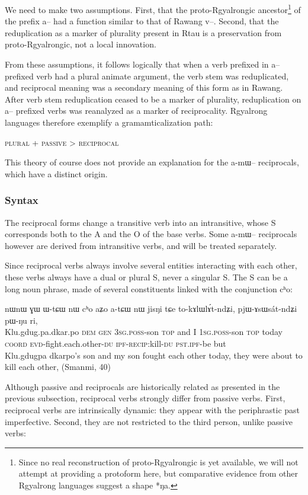 \documentclass[oldfontcommands,oneside,a4paper,11pt]{memoir}
\newcommand{\ipa}[1]{{\phon #1}} %
\newcommand{\coord}{\textsc{coord}}
\newcommand{\dem}{\textsc{dem}}
\newcommand{\du}{\textsc{du}}
\newcommand{\evd}{\textsc{evd}}
\newcommand{\gen}{\textsc{gen}}
\newcommand{\ipf}{\textsc{ipf}}
\newcommand{\poss}{\textsc{poss}}
\newcommand{\pst}{\textsc{pst}}
\newcommand{\sg}{\textsc{sg}}
\newcommand{\topic}{\textsc{top}}
\begin{document}
We need to make two assumptions. First, that the proto-Rgyalrongic  ancestor\footnote{Since no real reconstruction of proto-Rgyalrongic is yet available, we will not attempt at providing a protoform here, but comparative evidence from other Rgyalrong languages suggest a shape *ŋa.} of the prefix \ipa{a}-- had a function similar to that of Rawang \ipa{v}--. Second, that the reduplication as a marker of plurality present in Rtau is a preservation from proto-Rgyalrongic, not a local innovation.

From these assumptions, it follows logically that when a verb prefixed in  \ipa{a}--  prefixed verb had a plural animate argument, the verb stem was reduplicated, and   reciprocal meaning was a secondary meaning of this form as in Rawang. After verb stem reduplication ceased to be a marker of plurality, reduplication on \ipa{a}--  prefixed verbs was reanalyzed as a marker of reciprocality. Rgyalrong languages therefore exemplify a gramamticalization path:

\begin{exe}
\ex
 \glt  \textsc{plural} + \textsc{passive} > \textsc{reciprocal}
\end{exe} 

This theory of course does not provide an explanation for the  \ipa{a-mɯ}-- reciprocals, which have a distinct origin.


\subsubsection{Syntax}
The reciprocal forms change a transitive verb into an intransitive, whose S corresponds both to the A and the O of the base verbs. Some  \ipa{a-mɯ}-- reciprocals however are derived from intransitive verbs, and will be treated separately.

Since reciprocal verbs always involve several entities interacting with each other, these verbs always have a dual or plural S, never a singular S. The S can be a long noun phrase, made of several constituents linked with the conjunction \ipa{cʰo}:


\begin{exe}
\ex
\gll 	 	\ipa{qʰlɯʁdɯɣpakɤrpu} 	\ipa{nɯnɯ} 	\ipa{ɣɯ} 	\ipa{ɯ-tɕɯ} 	\ipa{nɯ} 	\ipa{cʰo} 	\ipa{aʑo} 	\ipa{a-tɕɯ} 	\ipa{nɯ} 	\ipa{jisŋi} 	\ipa{tɕe} 	\ipa{to-kɤlɯlɤ́t-ndʑi,} 	\ipa{pjɯ-ɤsɯsát-ndʑi} 	\ipa{pɯ-ŋu} 	\ipa{ri,} \\
Klu.gdug.pa.dkar.po \dem{} \gen{} 3\sg{}.\poss{}-son \topic{} and I 1\sg{}.\poss{}-son \topic{} today \coord{} \evd{}-fight.each.other-\du{} \ipf{}-\textsc{recip}:kill-\du{} \pst{}.\ipf{}-be but \\
 \glt  Klu.gdugpa dkarpo's son and my son  fought each other today, they were about to kill each other,  (Smanmi, 40)
 
\end{exe} 
Although passive and reciprocals are historically related as presented in the previous subsection, reciprocal verbs strongly differ from passive verbs. First, reciprocal verbs are intrinsically dynamic: they appear with the periphrastic past imperfective. Second, they are not restricted to the third person, unlike passive verbs:
\end{document}
